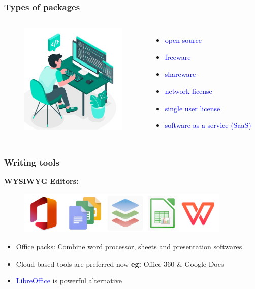 \documentclass[newPxFont,sthlmFooter]{beamer}
\newcommand{\fs}{\footnotesize}
\begin{document}
\begin{frame}\frametitle{Types of packages}
  \begin{columns}[T,onlytextwidth]
  \begin{figure}
    \centering
    \includegraphics[width=2in]{figs/pkg} 
  \end{figure}
     \vspace{1cm}
\begin{itemize}
  \fs
  \item \textcolor{blue}{open source}
  \item \textcolor{blue}{freeware}
  \item \textcolor{blue}{shareware}
  \item \textcolor{blue}{network license}
  \item \textcolor{blue}{single user license}
  \item \textcolor{blue}{software as a service (SaaS)}
  \end{itemize}
  \end{columns}
\end{frame}

\begin{frame}\frametitle{Writing tools}
{\bf WYSIWYG Editors:}\\
\begin{figure}
    \centering
    \includegraphics[width=4in]{figs/wt} 
\end{figure}
\begin{itemize}
\fs
\item Office packs: Combine word processor, sheets and presentation softwares
\item Cloud based tools are preferred now {\bf eg:} Office 360 \& Google Docs
\item \textcolor{blue}{LibreOffice} is powerful alternative
\end{itemize}
\end{frame}
\end{document}
